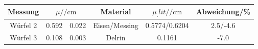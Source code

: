\label{tab:tabWürfel23}
	\begin{tabular}{cS[table-format=1.3]@{${}\pm{}$}S[table-format=1.3]ccc}
		\toprule
		{Messung} &  & {Material} & {$\mu_.{lit}/\si{\per\centi\metre}$} & {Abweichung/\si{\%}}\\
		\midrule
		 {Würfel 2}     & 0.592 & 0.022 & {Eisen/Messing} 	& 0.5774/0.6204	& 2.5/-4.6  \\
		 {Würfel 3} 	& 0.108 & 0.003 & {Delrin} 			& 0.1161  		& -7.0  \\
		\bottomrule
	\end{tabular}
